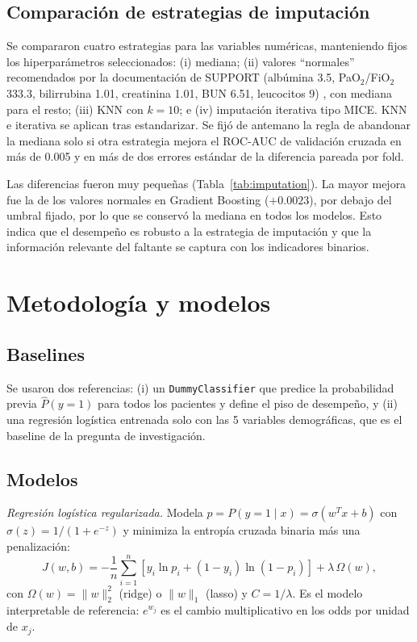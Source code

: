 \documentclass[conference]{IEEEtran}
\begin{document}
\subsection{Comparación de estrategias de imputación}
Se compararon cuatro estrategias para las variables numéricas, manteniendo fijos los hiperparámetros seleccionados: (i) mediana; (ii) valores ``normales'' recomendados por la documentación de SUPPORT (albúmina 3.5, PaO$_2$/FiO$_2$ 333.3, bilirrubina 1.01, creatinina 1.01, BUN 6.51, leucocitos 9) \cite{supportdata}, con mediana para el resto; (iii) KNN con $k=10$; e (iv) imputación iterativa tipo MICE. KNN e iterativa se aplican tras estandarizar. Se fijó de antemano la regla de abandonar la mediana solo si otra estrategia mejora el ROC-AUC de validación cruzada en más de 0.005 y en más de dos errores estándar de la diferencia pareada por fold.



Las diferencias fueron muy pequeñas (Tabla~\ref{tab:imputation}). La mayor mejora fue la de los valores normales en Gradient Boosting ($+0.0023$), por debajo del umbral fijado, por lo que se conservó la mediana en todos los modelos. Esto indica que el desempeño es robusto a la estrategia de imputación y que la información relevante del faltante se captura con los indicadores binarios.

\section{Metodología y modelos}
\label{sec:models}

\subsection{Baselines}
Se usaron dos referencias: (i) un \texttt{DummyClassifier} que predice la probabilidad previa $\hat P(y=1)$ para todos los pacientes y define el piso de desempeño, y (ii) una regresión logística entrenada solo con las 5 variables demográficas, que es el baseline de la pregunta de investigación.

\subsection{Modelos}
\textit{Regresión logística regularizada.} Modela $p=P(y=1\mid x)=\sigma(w^Tx+b)$ con $\sigma(z)=1/(1+e^{-z})$ y minimiza la entropía cruzada binaria más una penalización:
\begin{equation}
J(w,b)=-\frac1n\sum_{i=1}^{n}\left[y_i\ln p_i+(1-y_i)\ln(1-p_i)\right]+\lambda\,\Omega(w),
\end{equation}
con $\Omega(w)=\lVert w\rVert_2^2$ (ridge) o $\lVert w\rVert_1$ (lasso) y $C=1/\lambda$. Es el modelo interpretable de referencia: $e^{w_j}$ es el cambio multiplicativo en los odds por unidad de $x_j$.
\end{document}
